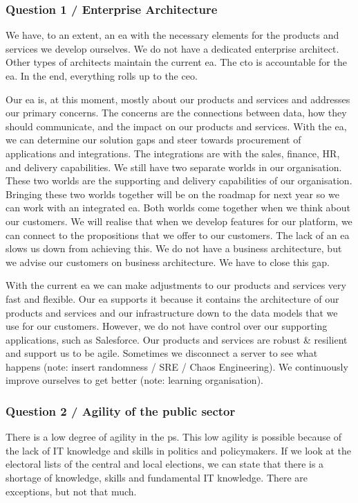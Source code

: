 \subsubsection{Question 1 / Enterprise Architecture}
We have, to an extent, an \acrshort{ea} with the necessary elements for the products and services we develop ourselves. We do not have a dedicated enterprise architect. Other types of architects maintain the current \acrshort{ea}. The \acrshort{cto} is accountable for the \acrshort{ea}. In the end, everything rolls up to the \acrshort{ceo}. 

Our \acrshort{ea} is, at this moment, mostly about our products and services and addresses our primary concerns. The concerns are the connections between data, how they should communicate, and the impact on our products and services. With the \acrshort{ea}, we can determine our solution gaps and steer towards procurement of applications and integrations. The integrations are with the sales, finance, HR, and delivery capabilities. We still have two separate worlds in our organisation. These two worlds are the supporting and delivery capabilities of our organisation. Bringing these two worlds together will be on the roadmap for next year so we can work with an integrated \acrshort{ea}. Both worlds come together when we think about our customers. We will realise that when we develop features for our platform, we can connect to the propositions that we offer to our customers. The lack of an \acrshort{ea} slows us down from achieving this. We do not have a business architecture, but we advise our customers on business architecture. We have to close this gap. 

With the current \acrshort{ea} we can make adjustments to our products and services very fast and flexible. Our \acrshort{ea} supports it because it contains the architecture of our products and services and our infrastructure down to the data models that we use for our customers. However, we do not have control over our supporting applications, such as Salesforce. Our products and services are \gls{robust} \& \gls{resilient} and support us to be \gls{agile}. Sometimes we disconnect a server to see what happens (note: insert randomness / SRE / Chaos Engineering). We continuously improve ourselves to get better (note: learning organisation).
\subsubsection{Question 2 / Agility of the public sector}
There is a low degree of agility in the \gls{ps}. This low \gls{agility} is possible because of the lack of IT knowledge and skills in politics and policymakers. If we look at the electoral lists of the central and local elections, we can state that there is a shortage of knowledge, skills and fundamental IT knowledge. There are exceptions, but not that much.

